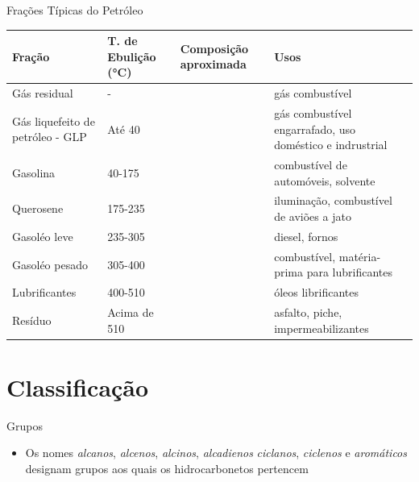 \documentclass[presentation,professionalfonts,smaller,aspectratio=169]{beamer}
\begin{document}
\begin{frame}[label={sec:org8337f74}]{Frações Típicas do Petróleo}
\begin{tabular}{|B|B|B|L|}
\hline
  {\bfseries Fração}   &   {\bfseries T. de Ebulição (°C)}   &   {\bfseries Composição aproximada}  &   {\bfseries Usos} \\[0pt]
\hline
Gás residual & - &   & gás combustível\\[0pt]
\hline
Gás liquefeito de petróleo - GLP & Até 40 &    & gás combustível engarrafado, uso doméstico e indrustrial\\[0pt]
\hline
Gasolina & 40-175 &  & combustível de automóveis, solvente\\[0pt]
\hline
Querosene & 175-235 &  & iluminação, combustível de aviões a jato\\[0pt]
\hline
Gasoléo leve & 235-305 &  & diesel, fornos\\[0pt]
\hline
Gasoléo pesado & 305-400 &  & combustível, matéria-prima para lubrificantes\\[0pt]
\hline
Lubrificantes & 400-510 &  & óleos librificantes\\[0pt]
\hline
Resíduo & Acima de 510 &  & asfalto, piche, impermeabilizantes\\[0pt]
\hline
\end{tabular}
\end{frame}


\section{Classificação}
\label{sec:org2158f47}

\begin{frame}[label={sec:org1d919c1}]{Grupos}
\begin{itemize}
\item Os nomes \emph{alcanos}, \emph{alcenos}, \emph{alcinos}, \emph{alcadienos} \emph{ciclanos}, \emph{ciclenos} e \emph{aromáticos} designam grupos aos quais os hidrocarbonetos pertencem
\end{itemize}

\end{frame}
\end{document}
